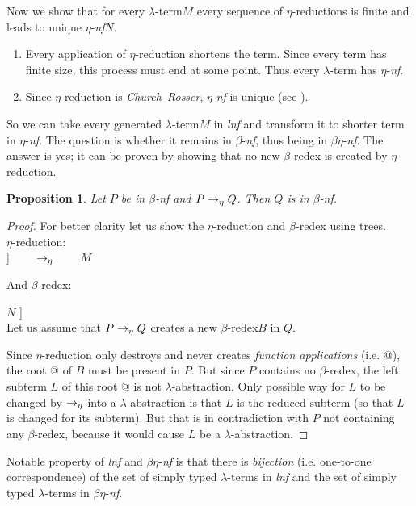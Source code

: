 \documentclass{sig-alternate}
\newtheorem{proposition}{Proposition}
\newcommand{\Lets}{Let us\xspace}
\newcommand{\lets}{let us\xspace}
\newcommand{\lterm}{$\lambda$-term\xspace}
\newcommand{\lterms}{$\lambda$-terms\xspace}
\newcommand{\lh}[1]{\lambda #1}
\newcommand{\ered}{$\eta$-reduction\xspace}
\newcommand{\bnf}{$\beta$-\textit{nf}\xspace}
\newcommand{\enf}{$\eta$-\textit{nf}\xspace}
\newcommand{\benf}{$\beta\eta$-\textit{nf}\xspace}
\newcommand{\bredex}{$\beta$-redex\xspace}
\newcommand{\lnf}{\textit{lnf}\xspace}
\begin{document}
Now we show that for every \lterm $M$ 
every sequence of $\eta$-reductions is finite and
leads to unique \enf $N$.

\begin{enumerate}
 \item Every application of \ered shortens the term.
       Since every term has finite size, this process must 
       end at some point. Thus every \lterm has \enf.
 \item Since \ered is \textit{Church–Rosser}, \enf is unique (see \cite{barendregt84}). 
\end{enumerate}

So we can take every generated \lterm $M$ in 
\lnf and transform it to shorter term in \enf. 
The question is whether it remains in \bnf, thus being in \benf.
The answer is yes; it can be proven by showing that no 
new \bredex is created by \ered.  

\begin{proposition}
Let $P$ be in \bnf and $P \rightarrow_\eta Q$. Then $Q$ is in \bnf.    
\end{proposition}
\begin{proof}

For better clarity \lets show the \ered and \bredex using trees.\\
\ered: \\

\Tree [.$\lh{x}$ [.@ $M$ $x$ ] ] 
~~~~$\rightarrow_\eta$~~~~
$M$ 

And \bredex:

\Tree [.@ [.$\lh{x}$ $M$ ] $N$ ] \\

\Lets assume that $P \rightarrow_\eta Q$ creates a new \bredex $B$ in $Q$.

Since \ered only destroys and never creates \textit{function applications} (i.e. @),
the root @ of $B$ must be present in $P$.  
But since $P$ contains no \bredex, the left subterm $L$ of this root @
is not $\lambda$-abstraction.
Only possible way for $L$ to be changed by $\rightarrow_\eta$ into 
a $\lambda$-abstraction is that $L$ is the reduced subterm (so that
$L$ is changed for its subterm).
But that is in contradiction with $P$ not containing any \bredex,
because it would cause $L$ be a $\lambda$-abstraction.

\end{proof}

Notable property of \lnf and \benf is that there is \textit{bijection} 
(i.e. one-to-one correspondence) of 
the set of simply typed \lterms in \lnf and 
the set of simply typed \lterms in \benf.
\end{document}

